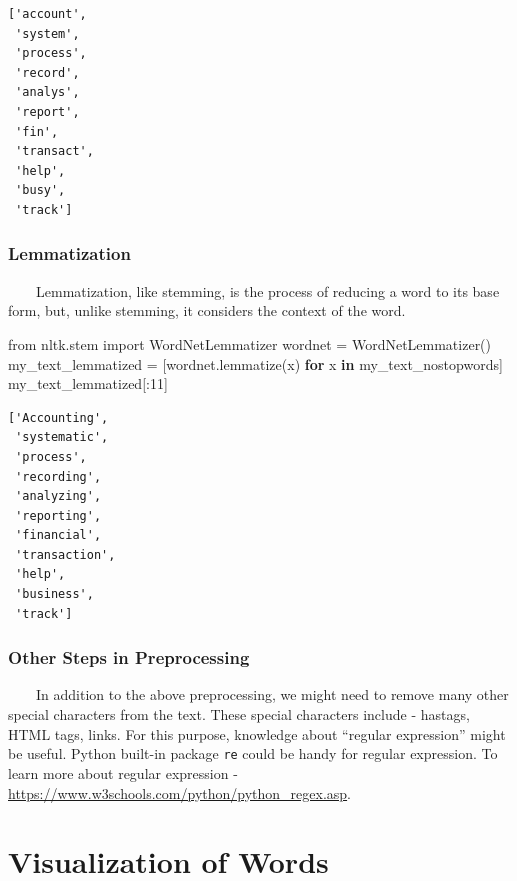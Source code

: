 \documentclass[
  letterpaper,
  DIV=11,
  numbers=noendperiod]{scrreprt}
\newenvironment{Shaded}{\begin{snugshade}}{\end{snugshade}}
\newcommand{\ControlFlowTok}[1]{\textcolor[rgb]{0.00,0.23,0.31}{\textbf{#1}}}
\newcommand{\DecValTok}[1]{\textcolor[rgb]{0.68,0.00,0.00}{#1}}
\newcommand{\ImportTok}[1]{\textcolor[rgb]{0.00,0.46,0.62}{#1}}
\newcommand{\KeywordTok}[1]{\textcolor[rgb]{0.00,0.23,0.31}{\textbf{#1}}}
\newcommand{\NormalTok}[1]{\textcolor[rgb]{0.00,0.23,0.31}{#1}}
\newcommand{\OperatorTok}[1]{\textcolor[rgb]{0.37,0.37,0.37}{#1}}
\begin{document}
\begin{verbatim}
['account',
 'system',
 'process',
 'record',
 'analys',
 'report',
 'fin',
 'transact',
 'help',
 'busy',
 'track']
\end{verbatim}

\subsubsection{Lemmatization}\label{lemmatization}

~~~~Lemmatization, like stemming, is the process of reducing a word to
its base form, but, unlike stemming, it considers the context of the
word.

\begin{Shaded}
\begin{Highlighting}[]
\ImportTok{from}\NormalTok{ nltk.stem }\ImportTok{import}\NormalTok{ WordNetLemmatizer}
\NormalTok{wordnet }\OperatorTok{=}\NormalTok{ WordNetLemmatizer()}
\NormalTok{my\_text\_lemmatized }\OperatorTok{=}\NormalTok{ [wordnet.lemmatize(x) }\ControlFlowTok{for}\NormalTok{ x }\KeywordTok{in}\NormalTok{ my\_text\_nostopwords]}
\NormalTok{my\_text\_lemmatized[:}\DecValTok{11}\NormalTok{]}
\end{Highlighting}
\end{Shaded}

\begin{verbatim}
['Accounting',
 'systematic',
 'process',
 'recording',
 'analyzing',
 'reporting',
 'financial',
 'transaction',
 'help',
 'business',
 'track']
\end{verbatim}

\subsubsection{Other Steps in
Preprocessing}\label{other-steps-in-preprocessing}

~~~~In addition to the above preprocessing, we might need to remove many
other special characters from the text. These special characters include
- hastags, HTML tags, links. For this purpose, knowledge about ``regular
expression'' might be useful. Python built-in package \texttt{re} could
be handy for regular expression. To learn more about regular expression
- \url{https://www.w3schools.com/python/python_regex.asp}.

\section{Visualization of Words}\label{visualization-of-words}
\end{document}
